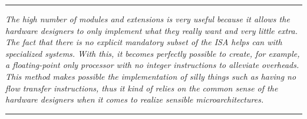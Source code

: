     \par\noindent\rule{\textwidth}{0.4pt}
    \textit{The high number of modules and extensions is very useful because it allows the hardware designers to only implement what they really want and very little extra. The fact that there is no explicit mandatory subset of the ISA helps can with specialized systems. With this, it becomes perfectly possible to create, for example, a floating-point only processor with no integer instructions to alleviate overheads. This method makes possible the implementation of silly things such as having no flow transfer instructions, thus it kind of relies on the common sense of the hardware designers when it comes to realize sensible microarchitectures.}
    \par\noindent\rule{\textwidth}{0.4pt}
